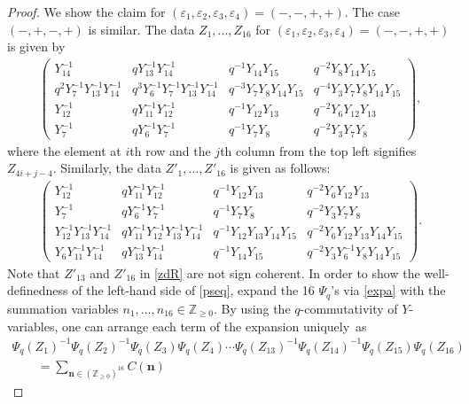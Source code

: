 \documentclass[pdftex]{sigma}
\newcommand{\Z}{{\mathbb Z}}
\numberwithin{equation}{section}
\begin{document}
\begin{proof}
 We show the claim for
 $(\varepsilon_1,\varepsilon_2,\varepsilon_3,\varepsilon_4)
 =(-,-,+,+)$. The case $(-,+,-,+)$ is similar. The data $Z_1,
 \dots, Z_{16}$ for
 $(\varepsilon_1,\varepsilon_2,\varepsilon_3,\varepsilon_4)=(-,-,+,+)$
 is given by
\begin{align}\label{zdL}
\begin{pmatrix}
Y_{14}^{-1} &
qY^{-1}_{13}Y^{-1}_{14} &
q^{-1}Y_{14}Y_{15} &
q^{-2}Y_{8}Y_{14}Y_{15}
\\
q^{2}Y^{-1}_7Y^{-1}_{13}Y^{-1}_{14} &
q^3Y^{-1}_6Y^{-1}_7Y^{-1}_{13}Y^{-1}_{14} &
q^{-3}Y_7Y_8Y_{14}Y_{15} &
q^{-4}Y_3Y_7Y_8Y_{14}Y_{15}
\\
Y^{-1}_{12} &
qY^{-1}_{11}Y^{-1}_{12} &
q^{-1}Y_{12}Y_{13}&
q^{-2}Y_6Y_{12} Y_{13}
\\
Y^{-1}_{7} &
qY^{-1}_6Y^{-1}_7 &
q^{-1}Y_7Y_8 &
q^{-2}Y_3Y_7Y_8
\end{pmatrix},
\end{align}
where the element at $i$th row and the $j$th column from the top left signifies
$Z_{4i+j-4}$.
%
Similarly,
the data $Z'_1, \dotsc, Z'_{16}$
is given as follows:
\begin{align}\label{zdR}
\begin{pmatrix}
Y^{-1}_{12} &
qY^{-1}_{11}Y^{-1}_{12} &
q^{-1}Y_{12} Y_{13}&
q^{-2}Y_6Y_{12} Y_{13}
\\
Y^{-1}_7 &
qY^{-1}_6Y^{-1}_7 &
q^{-1}Y_7Y_8 &
q^{-2}Y_3Y_7Y_8
\\
Y^{-1}_{12}Y^{-1}_{13}Y^{-1}_{14} &
qY^{-1}_{11}Y^{-1}_{12}Y^{-1}_{13}Y^{-1}_{14} &
q^{-1}Y_{12} Y_{13} Y_{14} Y_{15} &
q^{-2}Y_6Y_{12} Y_{13} Y_{14} Y_{15}
\\
Y_6Y^{-1}_{11}Y^{-1}_{14} &
qY^{-1}_{13}Y^{-1}_{14} &
q^{-1}Y_{14}Y_{15} &
q^{-2}Y_3Y^{-1}_6Y_8Y_{14}Y_{15}
\end{pmatrix}.
\end{align}
%
Note that $Z'_{13}$ and $Z'_{16}$ in \eqref{zdR} are not sign
coherent. In order to show the well-definedness of the left-hand side of
\eqref{pseq}, expand the 16 $\Psi_q$'s via \eqref{expa} with the
summation variables $n_1, \dots, n_{16} \in \Z_{\ge 0}$. By using
the $q$-commutativity of $Y$-variables, one can arrange each term of
the expansion uniquely~as
\begin{gather}
\Psi_q(Z_1)^{-1}\Psi_q(Z_2)^{-1}\Psi_q(Z_3)\Psi_q(Z_4)
\dotsm \Psi_q(Z_{13})^{-1}\Psi_q(Z_{14})^{-1}\Psi_q(Z_{15})\Psi_q(Z_{16})\nonumber
 \\
 \qquad= \sum_{\mathbf{n} \in (\Z_{\ge 0})^{16}}C(\mathbf{n})

\end{gather}
\end{proof}
\end{document}
